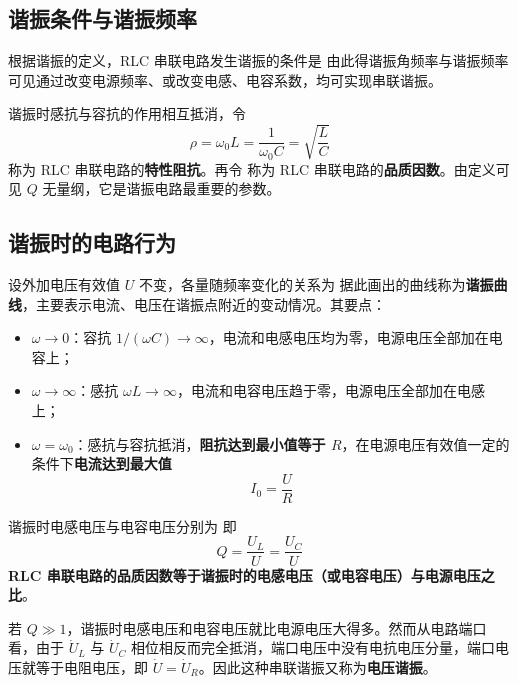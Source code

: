 \subsection{谐振条件与谐振频率}
根据谐振的定义，RLC 串联电路发生谐振的条件是
由此得谐振角频率与谐振频率
可见通过改变电源频率、或改变电感、电容系数，均可实现串联谐振。

谐振时感抗与容抗的作用相互抵消，令
\begin{equation}
\rho=\omega_0L=\frac{1}{\omega_0C}=\sqrt{\frac{L}{C}}
\end{equation}
称为 RLC 串联电路的\textbf{特性阻抗}。再令
称为 RLC 串联电路的\textbf{品质因数}。由定义可见 $Q$ 无量纲，它是谐振电路最重要的参数。

\subsection{谐振时的电路行为}
设外加电压有效值 $U$ 不变，各量随频率变化的关系为
据此画出的曲线称为\textbf{谐振曲线}，主要表示电流、电压在谐振点附近的变动情况。其要点：
\begin{itemize}
  \item $\omega\to0$：容抗 $1/(\omega C)\to\infty$，电流和电感电压均为零，电源电压全部加在电容上；
  \item $\omega\to\infty$：感抗 $\omega L\to\infty$，电流和电容电压趋于零，电源电压全部加在电感上；
  \item $\omega=\omega_0$：感抗与容抗抵消，\textbf{阻抗达到最小值等于 $R$}，在电源电压有效值一定的条件下\textbf{电流达到最大值}
  \begin{equation}
  I_0=\frac{U}{R}
  \end{equation}
\end{itemize}

谐振时电感电压与电容电压分别为
即
\begin{equation}
Q=\frac{U_L}{U}=\frac{U_C}{U}
\end{equation}
\textbf{RLC 串联电路的品质因数等于谐振时的电感电压（或电容电压）与电源电压之比}。

若 $Q\gg1$，谐振时电感电压和电容电压就比电源电压大得多。然而从电路端口看，由于 $\dot{U}_L$ 与 $\dot{U}_C$ 相位相反而完全抵消，端口电压中没有电抗电压分量，端口电压就等于电阻电压，即 $\dot{U}=\dot{U}_R$。因此这种串联谐振又称为\textbf{电压谐振}。


